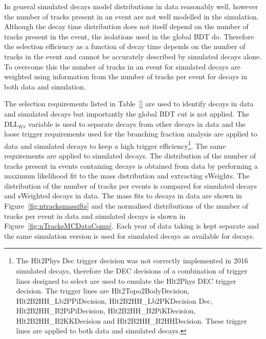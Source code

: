 In general simulated decays model distributions in data reasonably well, however the number of tracks present in an event are not well modelled in the simulation. %
Although the \bsmumu decay time distribution does not itself depend on the number of tracks present in the event, the isolations used in the global BDT do. Therefore the selection efficiency as a function of decay time depends on the number of tracks in the event and cannot be accurately described by simulated decays alone. To overcome this the number of tracks in an event for simulated \bsmumu decays are weighted using information from the number of tracks per event for \bdkpi decays in both data and simulation. 

The selection requirements listed in Table~\ref{} are used to identify \bdkpi decays in data and simulated decays but importantly the global BDT cut is not applied. The DLL$_{K\pi}$ variable is used to separate \bdkpi decays from other \bhh decays in data and the loose trigger requirements used for the branching fraction analysis are applied to data and simulated decays to keep a high trigger efficiency\footnote{The Hlt2Phys Dec trigger decision was not correctly implemented in 2016 simulated decays, therefore the DEC decisions of a combination of trigger lines designed to select \bhh are used to emulate the Hlt2Phys DEC trigger decision. The trigger lines are Hlt2Topo2BodyDecision, Hlt2B2HH\_Lb2PPiDecision, Hlt2B2HH\_Lb2PKDecision Dec, Hlt2B2HH\_B2PiPiDecision, Hlt2B2HH\_B2PiKDecision, Hlt2B2HH\_B2KKDecision and Hlt2B2HH\_B2HHDecision. These trigger lines are applied to both data and simulated decays.}. The same requirements are applied to simulated decays. The distribution of the number of tracks present in events containing \bdkpi decays is obtained from data by performing a maximum likelihood fit to the \bd mass distribution and extracting sWeights. The distribution of the number of tracks per events is compared for simulated \bdkpi decays and sWeighted \bdkpi decays in data. The mass fits to \bdkpi decays in data are shown in Figure~\ref{fig:ntracksmassifts} and the normalised distributions of the number of tracks per event in data and simulated decays is shown in Figure~\ref{fig:nTracksMCDataComp}. Each year of data taking is kept separate and the same simulation version is used for \bdkpi simulated decays as available for \bsmumu decays.



